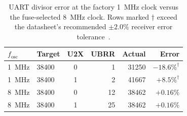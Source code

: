 \begin{table}[t]
  \caption{UART divisor error at the factory 1~MHz clock versus the fuse-selected
    8~MHz clock. Rows marked $\dagger$ exceed the datasheet's recommended
    $\pm 2.0\%$ receiver error tolerance~\cite{microchip2020}.}
  \label{tab:baud}
  \small
  \begin{tabular}{@{}llcrrr@{}}
    \toprule
    $f_{\mathrm{osc}}$ & Target & U2X & UBRR & Actual & Error \\
    \midrule
    1~MHz & 38400 & 0 & 1  & 31250 & $-18.6\%^{\dagger}$ \\
    1~MHz & 38400 & 1 & 2  & 41667 & $+8.5\%^{\dagger}$ \\
    \midrule
    8~MHz & 38400 & 0 & 12 & 38462 & $+0.16\%$ \\
    8~MHz & 38400 & 1 & 25 & 38462 & $+0.16\%$ \\
    \bottomrule
  \end{tabular}
\end{table}
